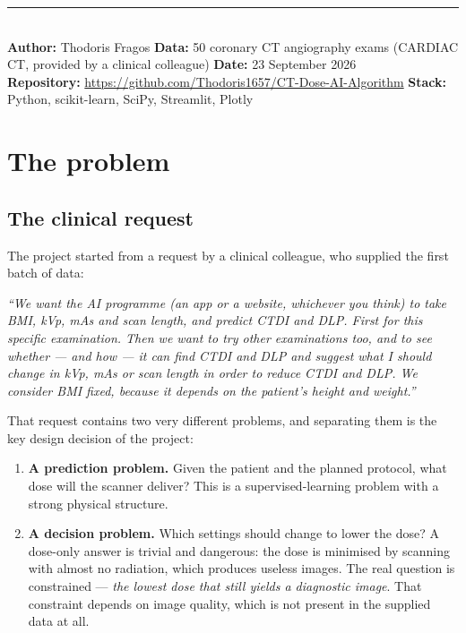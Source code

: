 \documentclass[10pt,a4paper]{article}
\begin{document}
\vfill
{\footnotesize\color{ctink2}\rule{\linewidth}{0.4pt}\\[3pt]
\textbf{\color{ctink}Author:} Thodoris Fragos \quad\textperiodcentered\quad
\textbf{\color{ctink}Data:} 50 coronary CT angiography exams (CARDIAC CT, provided by a clinical colleague)
\quad\textperiodcentered\quad \textbf{\color{ctink}Date:} 23 September 2026\\[2pt]
\textbf{\color{ctink}Repository:} \url{https://github.com/Thodoris1657/CT-Dose-AI-Algorithm}
\quad\textperiodcentered\quad
\textbf{\color{ctink}Stack:} Python, scikit-learn, SciPy, Streamlit, Plotly\par}

\clearpage

\section{The problem}

\subsection{The clinical request}
The project started from a request by a clinical colleague, who supplied the first batch of data:

\begin{callout}
\textit{``We want the AI programme (an app or a website, whichever you think) to take BMI, kVp, mAs and scan
length, and predict CTDI and DLP. First for this specific examination. Then we want to try other examinations too,
and to see whether --- and how --- it can find CTDI and DLP and suggest what I should change in kVp, mAs or scan
length in order to reduce CTDI and DLP. We consider BMI fixed, because it depends on the patient's height and
weight.''}
\end{callout}

That request contains two very different problems, and separating them is the key design decision of the project:

\begin{enumerate}
\item \textbf{A prediction problem.} Given the patient and the planned protocol, what dose will the scanner
deliver? This is a supervised-learning problem with a strong physical structure.
\item \textbf{A decision problem.} Which settings should change to lower the dose? A dose-only answer is trivial
and dangerous: the dose is minimised by scanning with almost no radiation, which produces useless images. The real
question is constrained --- \textit{the lowest dose that still yields a diagnostic image}. That constraint depends
on image quality, which is not present in the supplied data at all.
\end{enumerate}
\end{document}
